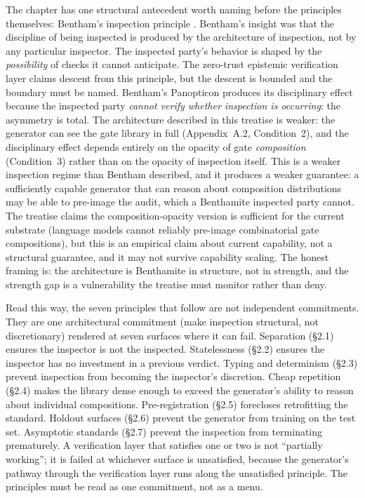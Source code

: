 \documentclass[11pt]{article}
\begin{document}
The chapter has one structural antecedent worth naming before the principles themselves: Bentham's inspection principle \citep{bentham1787}. Bentham's insight was that the discipline of being inspected is produced by the architecture of inspection, not by any particular inspector. The inspected party's behavior is shaped by the \emph{possibility} of checks it cannot anticipate. The zero-trust epistemic verification layer claims descent from this principle, but the descent is bounded and the boundary must be named. Bentham's Panopticon produces its disciplinary effect because the inspected party \emph{cannot verify whether inspection is occurring}: the asymmetry is total. The architecture described in this treatise is weaker: the generator can see the gate library in full (Appendix~A.2, Condition~2), and the disciplinary effect depends entirely on the opacity of gate \emph{composition} (Condition~3) rather than on the opacity of inspection itself. This is a weaker inspection regime than Bentham described, and it produces a weaker guarantee: a sufficiently capable generator that can reason about composition distributions may be able to pre-image the audit, which a Benthamite inspected party cannot. The treatise claims the composition-opacity version is sufficient for the current substrate (language models cannot reliably pre-image combinatorial gate compositions), but this is an empirical claim about current capability, not a structural guarantee, and it may not survive capability scaling. The honest framing is: the architecture is Benthamite in structure, not in strength, and the strength gap is a vulnerability the treatise must monitor rather than deny.

Read this way, the seven principles that follow are not independent commitments. They are one architectural commitment (make inspection structural, not discretionary) rendered at seven surfaces where it can fail. Separation (\S2.1) ensures the inspector is not the inspected. Statelessness (\S2.2) ensures the inspector has no investment in a previous verdict. Typing and determinism (\S2.3) prevent inspection from becoming the inspector's discretion. Cheap repetition (\S2.4) makes the library dense enough to exceed the generator's ability to reason about individual compositions. Pre-registration (\S2.5) forecloses retrofitting the standard. Holdout surfaces (\S2.6) prevent the generator from training on the test set. Asymptotic standards (\S2.7) prevent the inspection from terminating prematurely. A verification layer that satisfies one or two is not ``partially working''; it is failed at whichever surface is unsatisfied, because the generator's pathway through the verification layer runs along the unsatisfied principle. The principles must be read as one commitment, not as a menu.
\end{document}
